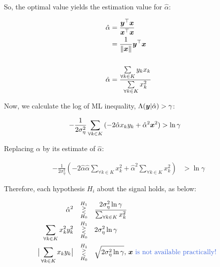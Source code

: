 \documentclass[17pt,a4paper]{extarticle}
\begin{document}
So, the optimal value yields the estimation value for $\hat{\alpha}$:
\begin{linenomath*} 
	\begin{align*}
		 {\hat{\alpha}}& ={\frac{{\boldsymbol {y}}^{\top}{\boldsymbol {x}}}{{\boldsymbol {x}}^{\top}{\boldsymbol {x}}}}\\
		 &= \frac{1}{\|{\boldsymbol {x}}\|}{{\boldsymbol {y}}^{\top}{\boldsymbol {x}}}\\
		 \\
		 {\hat{\alpha}}&=	
		 \frac{\sum\limits_{\forall k \in K}{ y_kx_k}}{\sum\limits_{\forall k \in K}{x^{2}_k}}
	\end{align*}
\end{linenomath*}

Now, we calculate the log of ML 
inequality, $\Lambda ({\boldsymbol {y}}|\hat{\alpha}) >\gamma$:
\begin{linenomath*} 
	\begin{align*}
		-\frac{1}{2\sigma^{2}_{\eta}}\sum_{\forall k \in K}{(-2\hat{\alpha}x_ky_k +\hat{\alpha}^{2}{\boldsymbol {x}}^{2})}&>\ln \gamma
	\end{align*}
\end{linenomath*}
Replacing $ {\alpha}$ by its estimate of $\hat{\alpha}$:
\begin{linenomath*} 
	\begin{align*}
		-\frac{1}{2\sigma^{2}_{\eta}}\left(-2\hat{\alpha}\hat{\alpha}\sum_{\forall k \in K}{x^{2}_k +\hat{\alpha}^{2}}\sum_{\forall k \in K}{x^{2}_k}\right)&>\ln\gamma
	\end{align*}
\end{linenomath*}
Therefore, each hypothesis $H_i$ about the signal holds, as below:
\begin{linenomath*} 
	\begin{align*}
		\hat{\alpha}^{2}\quad&\substack{H_1\\>\\<\\H_0}\quad\frac{2\sigma^{2}_{\eta}\ln\gamma}{\sum_{\forall k \in K}{x^{2}_k}}\\
		\sum_{\forall k \in K}{x^{2}_ky^{2}_k}\quad& \substack{H_1\\>\\<\\H_0}\quad 2\sigma^{2}_{\eta}\ln\gamma\\
		 {\big |\sum_{\forall k \in K}{x _ky _k}\big |}\quad& \substack{H_1\\>\\<\\H_0}\quad {\sqrt{2\sigma^{2}_{\eta}\ln\gamma}}, \,\ve{x} \textrm{ \gc{is not available practically!} }
	\end{align*}
\end{linenomath*}
\clearpage\newpage
\end{document}
